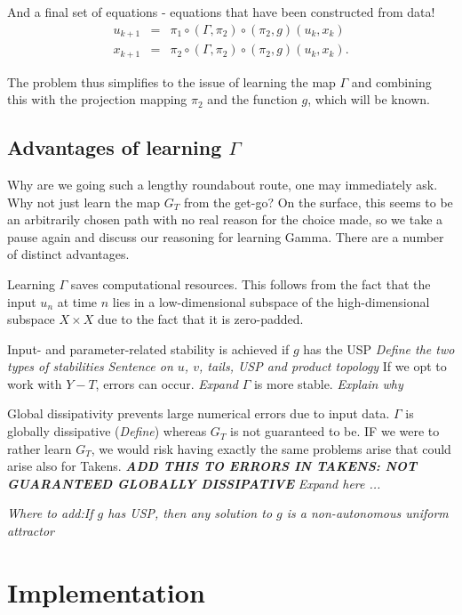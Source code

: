 \documentclass[12 pt]{article}
\begin{document}
And a final set of equations - equations that have been constructed from data!
\begin{eqnarray}
	u_{k+1} &=& \pi_1 \circ (\Gamma, \pi_2) \circ (\pi_2,g) (u_k,x_k) \label{Seqn_u}\\
	x_{k+1} &=& \pi_2 \circ (\Gamma, \pi_2) \circ (\pi_2,g) (u_k,x_k). \label{Seqn_x}
\end{eqnarray}

The problem thus simplifies to the issue of learning the map $\Gamma$ and combining this with the projection mapping $\pi_2$ and the function $g$, which will be known.

\subsection{Advantages of learning $\Gamma$}

Why are we going such a lengthy roundabout route, one may immediately ask. Why not just learn the map $G_T$ from the get-go? On the surface, this seems to be an arbitrarily chosen path with no real reason for the choice made, so we take a pause again and discuss our reasoning for learning Gamma.
There are a number of distinct advantages. 

Learning $\Gamma$ saves computational resources. This follows from the fact that the input $u_n$ at time $n$ lies in a low-dimensional subspace of the high-dimensional subspace $X\times{X}$ due to the fact that it is zero-padded. 

Input- and parameter-related stability is achieved if $g$ has the USP
\newline \emph{Define the two types of stabilities}
\newline \emph{Sentence on $u$, $v$, tails, USP and product topology}
\newline If we opt to work with $Y-T$, errors can occur. \emph{Expand}
\newline $\Gamma$ is more stable. \emph{Explain why}

Global dissipativity prevents large numerical errors due to input data. $\Gamma$ is globally dissipative (\emph{Define}) whereas $G_T$ is not guaranteed to be. IF we were to rather learn $G_T$, we would risk having exactly the same problems arise that could arise also for Takens. \textbf{\emph{ADD THIS TO ERRORS IN TAKENS: NOT GUARANTEED GLOBALLY DISSIPATIVE}}
\newline \emph{Expand here ...}

\emph{Where to add:If $g$ has USP, then any solution to $g$ is a non-autonomous uniform attractor}




\section{Implementation} \label{sect5}
 
 



\vspace{-1cm}


\end{document}
